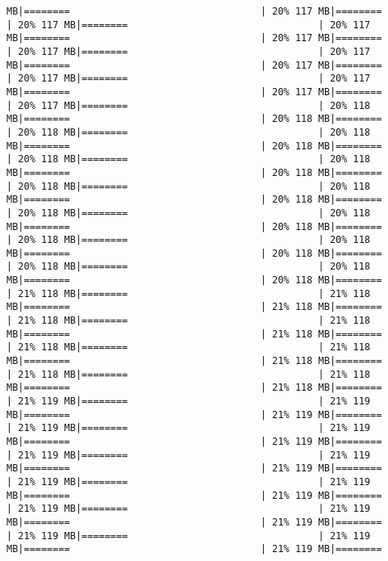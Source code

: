 \documentclass[
]{article}
\begin{document}
\begin{verbatim}
MB|========                                 | 20% 117 MB|========                                 | 20% 117 MB|========                                 | 20% 117 MB|========                                 | 20% 117 MB|========                                 | 20% 117 MB|========                                 | 20% 117 MB|========                                 | 20% 117 MB|========                                 | 20% 117 MB|========                                 | 20% 117 MB|========                                 | 20% 117 MB|========                                 | 20% 117 MB|========                                 | 20% 118 MB|========                                 | 20% 118 MB|========                                 | 20% 118 MB|========                                 | 20% 118 MB|========                                 | 20% 118 MB|========                                 | 20% 118 MB|========                                 | 20% 118 MB|========                                 | 20% 118 MB|========                                 | 20% 118 MB|========                                 | 20% 118 MB|========                                 | 20% 118 MB|========                                 | 20% 118 MB|========                                 | 20% 118 MB|========                                 | 20% 118 MB|========                                 | 20% 118 MB|========                                 | 20% 118 MB|========                                 | 20% 118 MB|========                                 | 20% 118 MB|========                                 | 20% 118 MB|========                                 | 20% 118 MB|========                                 | 21% 118 MB|========                                 | 21% 118 MB|========                                 | 21% 118 MB|========                                 | 21% 118 MB|========                                 | 21% 118 MB|========                                 | 21% 118 MB|========                                 | 21% 118 MB|========                                 | 21% 118 MB|========                                 | 21% 118 MB|========                                 | 21% 118 MB|========                                 | 21% 118 MB|========                                 | 21% 118 MB|========                                 | 21% 119 MB|========                                 | 21% 119 MB|========                                 | 21% 119 MB|========                                 | 21% 119 MB|========                                 | 21% 119 MB|========                                 | 21% 119 MB|========                                 | 21% 119 MB|========                                 | 21% 119 MB|========                                 | 21% 119 MB|========                                 | 21% 119 MB|========                                 | 21% 119 MB|========                                 | 21% 119 MB|========                                 | 21% 119 MB|========                                 | 21% 119 MB|========                                 | 21% 119 MB|========                                 | 21% 119 MB|========                                 | 21% 119 MB|========                                 | 21% 119 MB|========              
\end{verbatim}
\end{document}
